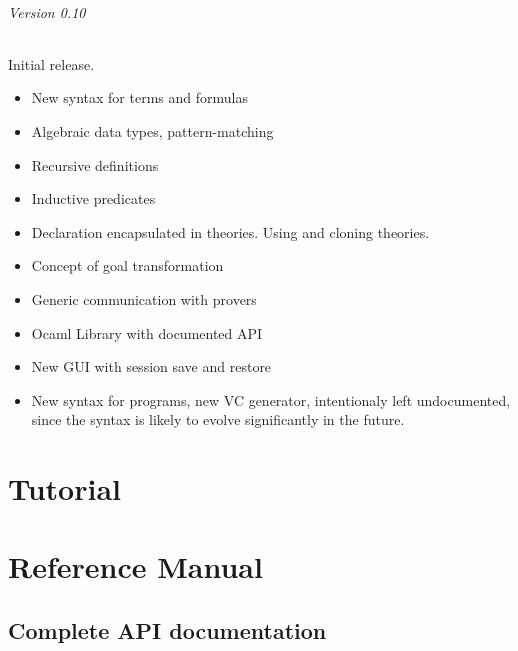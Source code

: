 \documentclass[a4paper,11pt,twoside,openright]{memoir}
\begin{document}
\paragraph{Version 0.10}
Initial release. 
\begin{itemize}
\item New syntax for terms and formulas
\item Algebraic data types, pattern-matching
\item Recursive definitions
\item Inductive predicates
\item Declaration encapsulated in theories. Using and cloning theories.
\item Concept of goal transformation
\item Generic communication with provers
\item Ocaml Library with documented API
\item New GUI with session save and restore
\item New syntax for programs, new VC generator, intentionaly left
  undocumented, since the syntax is likely to evolve significantly in
  the future.
\end{itemize}
\cleardoublepage

\tableofcontents




\part{Tutorial}





% 

% 



\part{Reference Manual}

% 







\chapter{Complete API documentation}
\label{chap:apidoc}





%
\end{document}
